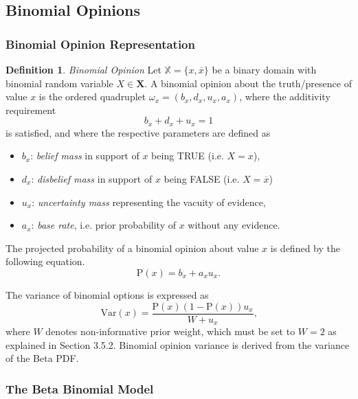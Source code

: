 \documentclass[a4paper,12pt]{article}
\theoremstyle{definition}
\newtheorem{definition}{Definition}[section]
\numberwithin{equation}{section}
\begin{document}
\subsection{Binomial Opinions}

\subsubsection{Binomial Opinion Representation}

\begin{definition}
	\emph{Binomial Opinion} Let $\mathbb{X} = \{x, \overline{x}\}$ be a binary domain with binomial random variable $X \in \mathbf{X}$. A binomial opinion about the truth/presence of value $x$ is the ordered quadruplet $\omega_x = \left(b_x, d_x, u_x, a_x\right)$, where the additivity requirement
	\begin{equation}
		b_x + d_x + u_x = 1
	\end{equation}
	is satisfied, and where the respective parameters are defined as
	\begin{itemize}
		\item $b_x$: \emph{belief mass} in support of $x$ being TRUE (i.e. $X = x$),
		\item $d_x$: \emph{disbelief mass} in support of $x$ being FALSE (i.e. $X = \overline{x}$)
		\item $u_x$: \emph{uncertainty mass} representing the vacuity of evidence,
		\item $a_x$: \emph{base rate}, i.e. prior probability of $x$ without any evidence.
	\end{itemize}
\end{definition}

The projected probability of a binomial opinion about value $x$ is defined by the following equation.
\begin{equation}
	\mathrm{P}(x) = b_x + a_x u_x\text{.}
\end{equation}

The variance of binomial options is expressed as
\begin{equation}
	\mathrm{Var}(x) = \dfrac{\mathrm{P}(x)(1 - \mathrm{P}(x))u_x}{W + u_x}\text{,}
\end{equation}
where $W$ denotes non-informative prior weight, which must be set to $W = 2$ as explained in Section 3.5.2. Binomial opinion variance is derived from the variance of the Beta PDF.

\subsubsection{The Beta Binomial Model}
\end{document}
